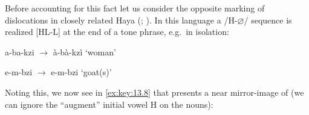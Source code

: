 \documentclass[output=paper]{langsci/langscibook}
\begin{document}
Before accounting for this fact let us consider the opposite marking of
dislocations in closely related Haya
(\citealt[201--202]{ByarushengoHymanTenenbaum1976};
\citealt[155]{HymanKatamba1999}). In this language a /H-$\varnothing$/ sequence is realized
[HL-L] at the end of a tone phrase, e.g.\ in isolation:

\ea\label{ex:key:13.7}
    \ea a-ba-kzi  ${\rightarrow}$  à-bà-kzì  ‘woman’ \\
    \ex e-m-bzi  ${\rightarrow}$  e-m-bzi  ‘goat(s)’ \\
    \z
\z

Noting this, we now see in \eqref{ex:key:13.8} that  presents a near
mirror-image of  (we can ignore the “augment” initial vowel H on the
nouns):
\end{document}
